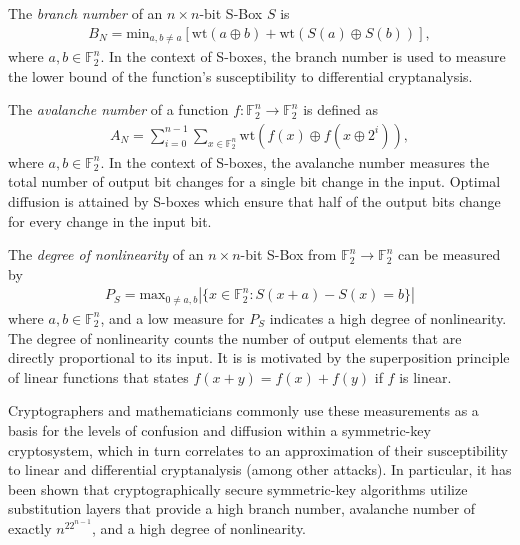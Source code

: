 \documentclass[11pt]{article}
\newcommand{\field}[1]{\mathbb{#1}} %
\begin{document}
\begin{define}
The \emph{branch number} of an $n \times n$-bit S-Box $S$ is
\begin{eqnarray}
B_N = \text{min}_{a, b\not=a}\left[\text{wt}(a \oplus b) + \text{wt}(S(a) \oplus S(b))\right],
\end{eqnarray}
where $a, b \in \field{F}_2^n$. In the context of S-boxes, the branch number is used to measure the lower bound of the function's susceptibility to differential cryptanalysis.
\end{define}

\begin{define}
The \emph{avalanche number} of a function $f : \field{F}_2^n \to \field{F}_2^n$ is defined as
\begin{eqnarray}
A_N = \sum_{i = 0}^{n - 1}\sum_{x \in \field{F}_2^n} \text{wt}(f(x) \oplus f(x \oplus 2^{i})),
\end{eqnarray}
where $a, b \in \field{F}_2^n$. In the context of S-boxes, the avalanche number measures the total number of output bit changes for a single bit change in the input. Optimal diffusion is attained by S-boxes which ensure that half of the output bits change for every change in the input bit.
\end{define}

\begin{define}
The \emph{degree of nonlinearity} of an $n \times n$-bit S-Box from $\field{F}_2^n \to \field{F}_2^n$ can be measured by
\begin{eqnarray}
	P_S = \text{max}_{0 \not= a, b}|\{x \in \field{F}_2^n : S(x + a) - S(x) = b\}|
\end{eqnarray}
where $a, b \in \field{F}_2^n$, and a low measure for $P_S$ indicates a high degree of nonlinearity. The degree of nonlinearity counts the number of output elements that are directly proportional to its input. It is is motivated by the superposition principle of linear functions that states $f(x + y) = f(x) + f(y)$ if $f$ is linear.
\end{define}

Cryptographers and mathematicians commonly use these measurements as a basis for the levels of confusion and diffusion within a symmetric-key cryptosystem, which in turn correlates to an approximation of their susceptibility to linear and differential cryptanalysis (among other attacks). In particular, it has been shown that cryptographically secure symmetric-key algorithms utilize substitution layers that provide a high branch number, avalanche number of exactly $n^22^{n-1}$, and a high degree of nonlinearity.
\end{document}
